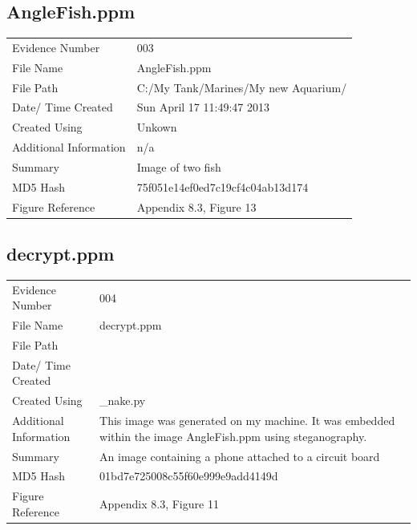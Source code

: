 \documentclass[12pt]{article}
\begin{document}
				\subsection{AngleFish.ppm}
					\begin{tabular}{l | p{8cm}}
						Evidence Number & 003  \\
			    			File Name & AngleFish.ppm \\
			      			File Path & C:/My Tank/Marines/My new Aquarium/  \\
						Date/ Time Created & Sun April 17 11:49:47 2013 \\
						Created Using & Unkown \\
						Additional Information & n/a \\
						Summary & Image of two fish\\
						MD5 Hash & 75f051e14ef0ed7c19cf4c04ab13d174 \\
						Figure Reference & Appendix 8.3, Figure 13\\
					\end{tabular}

				\subsection{decrypt.ppm}
					\begin{tabular}{l | p{8cm}}
						Evidence Number & 004  \\
			    			File Name & decrypt.ppm \\
			      			File Path & \\
						Date/ Time Created & \\
						Created Using & \_nake.py \\
						Additional Information & This image was generated on my machine. It was embedded within the image AngleFish.ppm using steganography.\\
						Summary & An image containing a phone attached to a circuit board \\
						MD5 Hash & 01bd7e725008c55f60e999e9add4149d \\
						Figure Reference & Appendix 8.3, Figure 11\\
					\end{tabular}
\end{document}
